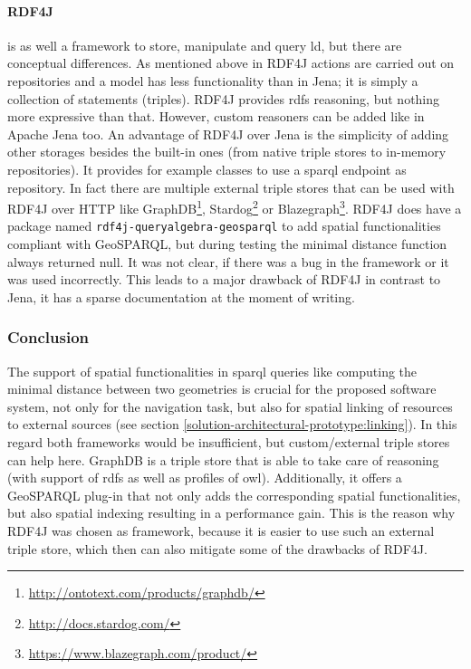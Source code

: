 \documentclass[draft,final]{vutinfth} %
\begin{document}
\paragraph{RDF4J} is as well a framework to store, manipulate and query \gls{ld}, but there are conceptual differences. As mentioned above in RDF4J actions are carried out on repositories and a model has less functionality than in Jena; it is simply a collection of statements (triples). RDF4J provides \gls{rdfs} reasoning, but nothing more expressive than that. However, custom reasoners can be added like in Apache Jena too. An advantage of RDF4J over Jena is the simplicity of adding other storages besides the built-in ones (from native triple stores to in-memory repositories). It provides for example classes to use a \gls{sparql} endpoint as repository. In fact there are multiple external triple stores that can be used with RDF4J over HTTP like GraphDB\footnote{\url{http://ontotext.com/products/graphdb/}}, Stardog\footnote{\url{http://docs.stardog.com/}} or Blazegraph\footnote{\url{https://www.blazegraph.com/product/}}. RDF4J does have a package named \texttt{rdf4j-queryalgebra-geosparql} to add spatial functionalities compliant with GeoSPARQL, but during testing the minimal distance function always returned null. It was not clear, if there was a bug in the framework or it was used incorrectly. This leads to a major drawback of RDF4J in contrast to Jena, it has a sparse documentation at the moment of writing.

\subsubsection{Conclusion}

The support of spatial functionalities in \gls{sparql} queries like computing the minimal distance between two geometries is crucial for the proposed software system, not only for the navigation task, but also for spatial linking of resources to external sources (see section \ref{solution-architectural-prototype:linking}). In this regard both frameworks would be insufficient, but custom/external triple stores can help here. GraphDB is a triple store that is able to take care of reasoning (with support of \gls{rdfs} as well as profiles of \gls{owl}). Additionally, it offers a GeoSPARQL plug-in that not only adds the corresponding spatial functionalities, but also spatial indexing resulting in a performance gain. This is the reason why RDF4J was chosen as framework, because it is easier to use such an external triple store, which then can also mitigate some of the drawbacks of RDF4J.
\end{document}
